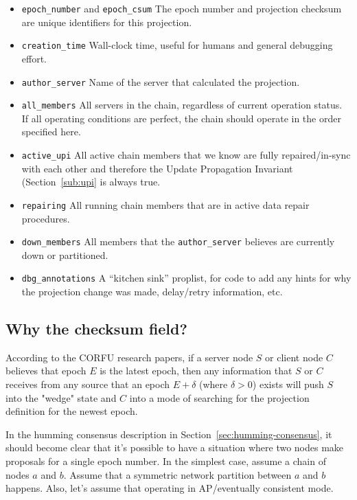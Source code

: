 \documentclass[preprint,10pt]{sigplanconf}
\begin{document}
\begin{itemize}
\item {\tt epoch\_number} and {\tt epoch\_csum} The epoch number and
  projection checksum are unique identifiers for this projection.
\item {\tt creation\_time} Wall-clock time, useful for humans and
  general debugging effort.
\item {\tt author\_server} Name of the server that calculated the projection.
\item {\tt all\_members} All servers in the chain, regardless of current
  operation status.  If all operating conditions are perfect, the
  chain should operate in the order specified here.
\item {\tt active\_upi} All active chain members that we know are
  fully repaired/in-sync with each other and therefore the Update
  Propagation Invariant (Section~\ref{sub:upi} is always true.
\item {\tt repairing} All running chain members that
  are in active data repair procedures.
\item {\tt down\_members} All members that the {\tt author\_server}
  believes are currently down or partitioned.
\item {\tt dbg\_annotations} A ``kitchen sink'' proplist, for code to
  add any hints for why the projection change was made, delay/retry
  information, etc.
\end{itemize}

\subsection{Why the checksum field?}

According to the CORFU research papers, if a server node $S$ or client
node $C$ believes that epoch $E$ is the latest epoch, then any information
that $S$ or $C$ receives from any source that an epoch $E+\delta$ (where
$\delta > 0$) exists will push $S$ into the "wedge" state and $C$ into a mode
of searching for the projection definition for the newest epoch.

In the humming consensus description in
Section~\ref{sec:humming-consensus}, it should become clear that it's
possible to have a situation where two nodes make proposals
for a single epoch number.  In the simplest case, assume a chain of
nodes $a$ and $b$.  Assume that a symmetric network partition between
$a$ and $b$ happens. Also, let's assume that operating in
AP/eventually consistent mode.
\end{document}
